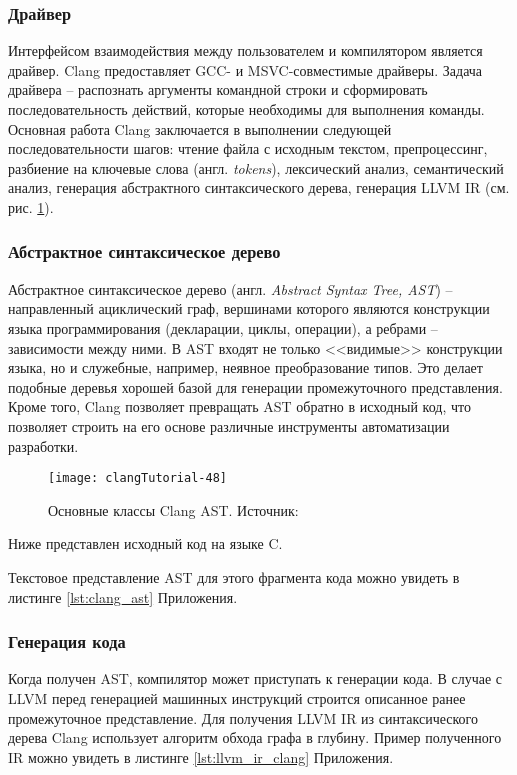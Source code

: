 \subsubsection{Драйвер}
Интерфейсом взаимодействия между пользователем и компилятором является драйвер.
Clang предоставляет GCC- и MSVC-совместимые драйверы. Задача драйвера --
распознать аргументы командной строки и сформировать последовательность действий,
которые необходимы для выполнения команды. Основная работа Clang заключается
в выполнении следующей последовательности шагов: чтение файла с исходным текстом,
препроцессинг, разбиение на ключевые слова (англ. \textit{tokens}), лексический
анализ, семантический анализ, генерация абстрактного синтаксического дерева,
генерация LLVM IR (см. рис. \ref{fig:clang_core}).

\subsubsection{Абстрактное синтаксическое дерево}
Абстрактное синтаксическое дерево (англ. \textit{Abstract Syntax Tree, AST}) --
направленный ациклический граф, вершинами которого являются конструкции языка 
программирования (декларации, циклы, операции), а ребрами -- зависимости между
ними. В AST входят не только <<видимые>> конструкции языка, но и служебные,
например, неявное преобразование типов. Это делает подобные деревья хорошей
базой для генерации промежуточного представления. Кроме того, Clang позволяет
превращать AST обратно в исходный код, что позволяет строить на его основе
различные инструменты автоматизации разработки.
\begin{figure}[h]
  \label{fig:clang_core}
  \centering
  \texttt{[image: clangTutorial-48]}
  \caption{Основные классы Clang AST. Источник: \cite{VanHaagstretSvenARMandStulova2019}}
\end{figure}

Ниже представлен исходный код на языке C.

Текстовое представление AST для этого фрагмента кода можно увидеть в листинге
\ref{lst:clang_ast} Приложения.

\subsubsection{Генерация кода}
Когда получен AST, компилятор может приступать к генерации кода. В случае с LLVM
перед генерацией машинных инструкций строится описанное ранее промежуточное
представление. Для получения LLVM IR из синтаксического дерева Clang использует
алгоритм обхода графа в глубину. Пример полученного IR можно увидеть в листинге
\ref{lst:llvm_ir_clang} Приложения.

